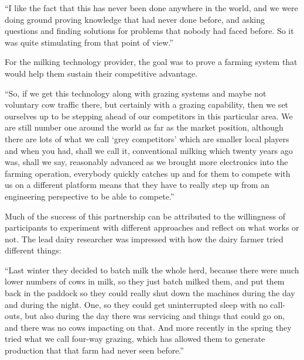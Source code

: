 \begin{displayquote}[Participant 10/2]
\small
\enquote{I like the fact that this has never been done anywhere in the world, and we were doing ground proving knowledge that had never done before, and asking questions and finding solutions for problems that nobody had faced before. So it was quite stimulating from that point of view.} 
\end{displayquote}


For the milking technology provider, the goal was to prove a farming system that would help them sustain their competitive advantage. 

\begin{displayquote}[Participant 18/2]
\small
\enquote{So, if we get this technology along with grazing systems and maybe not voluntary cow traffic there, but certainly with a grazing capability, then we set ourselves up to be stepping ahead of our competitors in this particular area. We are still number one around the world as far as the market position, although there are lots of what we call \enquote{grey competitors} which are smaller local players and when you had, shall we call it, conventional milking which twenty years ago was, shall we say, reasonably advanced as we brought more electronics into the farming operation, everybody quickly catches up and for them to compete with us on a different platform means that they have to really step up from an engineering perspective to be able to compete.}  
\end{displayquote}


Much of the success of this partnership can be attributed to the willingness of participants to experiment with different approaches and reflect on what works or not. The lead dairy researcher was impressed with how the dairy farmer tried different things:

\begin{displayquote}[Participant 8/2]
\small
\enquote{Last winter they decided to batch milk the whole herd, because there were much lower numbers of cows in milk, so they just batch milked them, and put them back in the paddock so they could really shut down the machines during the day and during the night. One, so they could get uninterrupted sleep with no call-outs, but also during the day there was servicing and things that could go on, and there was no cows impacting on that. And more recently in the spring they tried what we call four-way grazing, which has allowed them to generate production that that farm had never seen before.} 
\end{displayquote}


